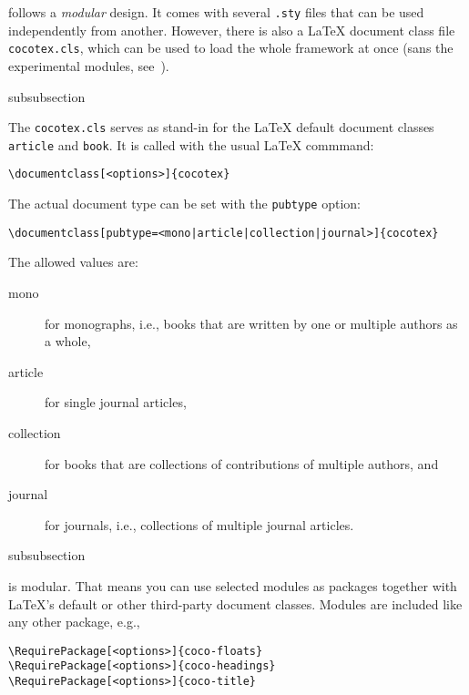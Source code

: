 {\CoCoTeX} follows a \textit{modular} design. It comes with several
\lstinline{.sty} files that can be used independently from
another. However, there is also a {\LaTeX} document class file
\lstinline{cocotex.cls}, which can be used to load the whole framework
at once (sans the experimental modules,
see~).

\begin{heading}{subsubsection}
\end{heading}

The \lstinline{cocotex.cls} serves as stand-in for the {\LaTeX}
default document classes \lstinline{article} and \lstinline{book}. It
is called with the usual {\LaTeX} commmand:
\begin{lstlisting}[style=tex]
\documentclass[<options>]{cocotex}
\end{lstlisting}

The actual document type can be set with the \lstinline{pubtype} option:
\begin{lstlisting}[style=tex]
\documentclass[pubtype=<mono|article|collection|journal>]{cocotex}
\end{lstlisting}
The allowed values are:
\begin{description}
\item[\ttfamily mono] for monographs, i.e., books that are written by one or
  multiple authors as a whole,
\item[\ttfamily article] for single journal articles,
\item[\ttfamily collection] for books that are collections of contributions of
  multiple authors, and
\item[\ttfamily journal] for journals, i.e., collections of multiple journal
  articles.
\end{description}

\begin{heading}{subsubsection}
\end{heading}

{\CoCoTeX} is modular. That means you can use selected modules as
packages together with \LaTeX's default or other third-party document
classes. Modules are included like any other package, e.g.,
\begin{lstlisting}[style=tex]
\RequirePackage[<options>]{coco-floats}
\RequirePackage[<options>]{coco-headings}
\RequirePackage[<options>]{coco-title}
\end{lstlisting}

